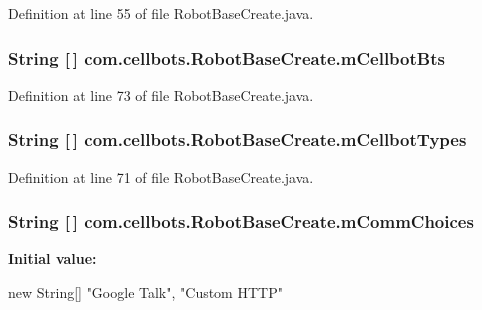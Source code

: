 Definition at line 55 of file Robot\-Base\-Create.\-java.

\hypertarget{classcom_1_1cellbots_1_1_robot_base_create_a60382b286edc68e4d6544aac289543fb}{
\subsubsection[{m\-Cellbot\-Bts}]{\setlength{\rightskip}{0pt plus 5cm}String \mbox{[}$\,$\mbox{]} {\bf com.\-cellbots.\-Robot\-Base\-Create.\-m\-Cellbot\-Bts}}}\label{classcom_1_1cellbots_1_1_robot_base_create_a60382b286edc68e4d6544aac289543fb}


Definition at line 73 of file Robot\-Base\-Create.\-java.

\hypertarget{classcom_1_1cellbots_1_1_robot_base_create_a83b5a7890ea7a107403eb9b7eab71ae9}{
\subsubsection[{m\-Cellbot\-Types}]{\setlength{\rightskip}{0pt plus 5cm}String \mbox{[}$\,$\mbox{]} {\bf com.\-cellbots.\-Robot\-Base\-Create.\-m\-Cellbot\-Types}}}\label{classcom_1_1cellbots_1_1_robot_base_create_a83b5a7890ea7a107403eb9b7eab71ae9}


Definition at line 71 of file Robot\-Base\-Create.\-java.

\hypertarget{classcom_1_1cellbots_1_1_robot_base_create_a2d9ebfd2f0fbbb3ae015a8693e0a5314}{
\subsubsection[{m\-Comm\-Choices}]{\setlength{\rightskip}{0pt plus 5cm}String \mbox{[}$\,$\mbox{]} {\bf com.\-cellbots.\-Robot\-Base\-Create.\-m\-Comm\-Choices}}}\label{classcom_1_1cellbots_1_1_robot_base_create_a2d9ebfd2f0fbbb3ae015a8693e0a5314}
{\bfseries Initial value\-:}
\begin{DoxyCode}
 new String[] { 
                        "Google Talk", "Custom HTTP" }
\end{DoxyCode}


